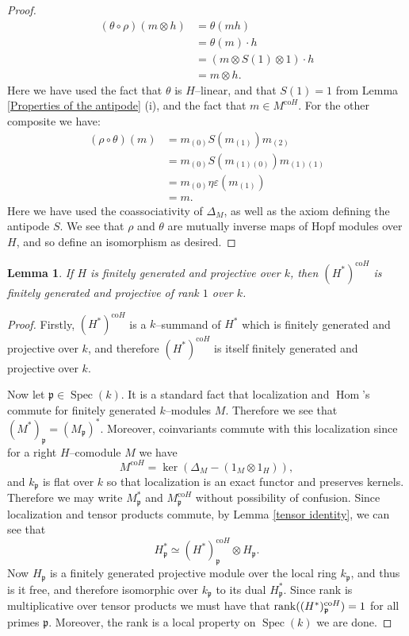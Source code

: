 \documentclass{article}
\theoremstyle{plain}
\newtheorem{Lemma}[Th]{Lemma}
\theoremstyle{definition}
\DeclareMathOperator{\Hom}{Hom}
\DeclareMathOperator{\Spec}{Spec}
\newcommand{\mf}{\mathfrak}
\begin{document}
\begin{proof}
    \begin{align*}
       (\theta\circ\rho)(m\otimes h) &= \theta(mh) \\
       &=\theta(m)\cdot h \\
       &=(m\otimes S(1)\otimes 1) \cdot h \\
       &=m\otimes h.
    \end{align*}
    Here we have used the fact that $\theta$ is $H$--linear, and that $S(1)=1$ from Lemma \ref{Properties of the antipode} (i), and the fact that $m\in M^{\text{co}H}$. For the other composite we have:
    \begin{align*}
        (\rho \circ \theta)(m) &= m_{(0)}S(m_{(1)})m_{(2)} \\
        &=m_{(0)}S(m_{(1)(0)})m_{(1)(1)} \\
        &=m_{(0)} \eta\varepsilon (m_{(1)}) \\
        &=m.
    \end{align*}
    Here we have used the coassociativity of $\Delta_M$, as well as the axiom defining the antipode $S$. We see that $\rho$ and $\theta$ are mutually inverse maps of Hopf modules over $H$, and so define an isomorphism as desired.
\end{proof}
 
\begin{Lemma}\label{coinvariants are rank 1}
    If $H$ is finitely generated and projective over $k$, then $(H^*)^{\text{co}H}$ is finitely generated and projective of rank $1$ over $k$.
\end{Lemma}
\begin{proof}
    Firstly, $(H^*)^{\text{co}H}$ is a $k$--summand of $H^*$ which is finitely generated and projective over $k$, and therefore $(H^*)^{\text{co}H}$ is itself finitely generated and projective over $k$.

    Now let $\mf{p}\in \Spec(k)$. It is a standard fact that localization and $\Hom$'s commute for finitely generated $k$--modules $M$. Therefore we see that $(M^*)_\mf{p}=(M_\mf{p})^*$. Moreover, coinvariants commute with this localization since for a right $H$--comodule $M$ we have 
    \[
    M^{\text{co}H}=\ker(\Delta_M-(1_M\otimes 1_H)),
    \]
    and $k_\mf{p}$ is flat over $k$ so that localization is an exact functor and preserves kernels. Therefore we may write $M^*_\mf{p}$ and $M^{\text{co}H}_\mf{p}$ without possibility of confusion. Since localization and tensor products commute, by Lemma \ref{tensor identity}, we can see that 
    \[
    H^*_\mf{p} \simeq (H^*)^{\text{co}H}_\mf{p} \otimes H_\mf{p}.
    \]
   Now $H_\mf{p}$ is a finitely generated projective module over the local ring $k_\mf{p}$, and thus is it free, and therefore isomorphic over $k_\mf{p}$ to its dual $H^*_\mf{p}$. Since rank is multiplicative over tensor products we must have that $\rank((H^*)^{\text{co}H}_\mf{p})=1$ for all primes $\mf{p}$. Moreover, the rank is a local property on $\Spec(k)$ we are done.
\end{proof}
\end{document}
